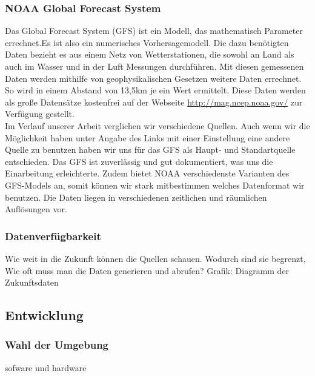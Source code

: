 \documentclass[a4paper,oneside,12pt,titlepage]{article}
\newcommand{\link}[1]{\textcolor{link}{\url{#1}}}	%
\begin{document}
\subsubsection*{NOAA Global Forecast System} %
Das Global Forecast System (GFS)  ist ein Modell, das mathematisch Parameter errechnet.Es ist also ein numerisches Vorhersagemodell. Die dazu benötigten Daten bezieht es aus einem Netz von Wetterstationen, die sowohl an Land als auch im Wasser und in der Luft Messungen durchführen. Mit diesen gemessenen Daten werden mithilfe von geophysikalischen Gesetzen weitere Daten errechnet. So wird in einem Abstand von 13,5km je ein Wert ermittelt. Diese Daten werden als große Datensätze kostenfrei auf der Webseite \link{http://mag.ncep.noaa.gov/} \cite{ncep}  zur Verfügung gestellt.\\
Im Verlauf unserer Arbeit verglichen wir verschiedene Quellen. Auch wenn wir die Möglichkeit haben unter Angabe des Links mit einer Einstellung eine andere Quelle zu benutzen haben wir uns für das GFS als Haupt- und Standartquelle entschieden. Das GFS ist zuverlässig und gut dokumentiert, was uns die Einarbeitung erleichterte. Zudem bietet NOAA verschiedenste Varianten des GFS-Models an, somit können wir stark mitbestimmen welches Datenformat wir benutzen. Die Daten liegen in verschiedenen zeitlichen und räumlichen Auflösungen vor.

\subsubsection{Datenverfügbarkeit} %
Wie weit in die Zukunft können die Quellen schauen. Wodurch sind sie begrenzt, Wie oft muss man die Daten generieren und abrufen?
Grafik: Diagramm der Zukunftsdaten

\subsection{Entwicklung} %

\subsubsection{Wahl der Umgebung}\label{sec:ent} %
sofware und hardware
\end{document}
